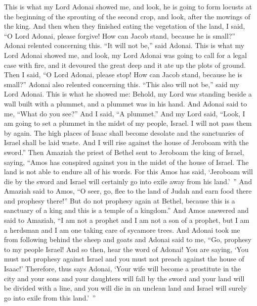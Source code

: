 \begin{biblechapter} %
 This is what my Lord Adonai showed me, and look, he is going to form locusts at the beginning of the sprouting of the second crop, and look, after the mowings of the king.
\verse And then when they finished eating the vegetation of the land, I said, “O Lord Adonai, please forgive! How can Jacob stand, because he is small?”
\verse Adonai relented concerning this. “It will not be,” said Adonai.
\verse This is what my Lord Adonai showed me, and look, my Lord Adonai was going to call for a legal case with fire, and it devoured the great deep and it ate up the plots of ground.
\verse Then I said, “O Lord Adonai, please stop! How can Jacob stand, because he is small?”
\verse Adonai also relented concerning this. “This also will not be,” said my Lord Adonai.
\verse This is what he showed me: Behold, my Lord was standing beside a wall built with a plummet, and a plummet was in his hand.
\verse And Adonai said to me, “What do you see?” And I said, “A plummet.” And my Lord said, “Look, I am going to set a plummet in the midst of my people, Israel. I will not pass them by again.
\verse The high places of Isaac shall become desolate and the sanctuaries of Israel shall be laid waste. And I will rise against the house of Jeroboam with the sword.”
 Then Amaziah the priest of Bethel sent to Jeroboam the king of Israel, saying, “Amos has conspired against you in the midst of the house of Israel. The land is not able to endure all of his words.
\verse For this Amos has said, ‘Jeroboam will die by the sword and Israel will certainly go into exile away from his land.’ ”
\verse And Amaziah said to Amos, “O seer, go, flee to the land of Judah and earn food there and prophesy there!”
\verse But do not prophesy again at Bethel, because this is a sanctuary of a king and this is a temple of a kingdom.”
\verse And Amos answered and said to Amaziah, “I am not a prophet and I am not a son of a prophet, but I am a herdsman and I am one taking care of sycamore trees.
\verse And Adonai took me from following behind the sheep and goats and Adonai said to me, “Go, prophesy to my people Israel!
\verse And so then, hear the word of Adonai! You are saying, ‘You must not prophesy against Israel and you must not preach against the house of Isaac!’
\verse Therefore, thus says Adonai, ‘Your wife will become a prostitute in the city and your sons and your daughters will fall by the sword and your land will be divided with a line, and you will die in an unclean land and Israel will surely go into exile from this land.’ ”
\end{biblechapter}

